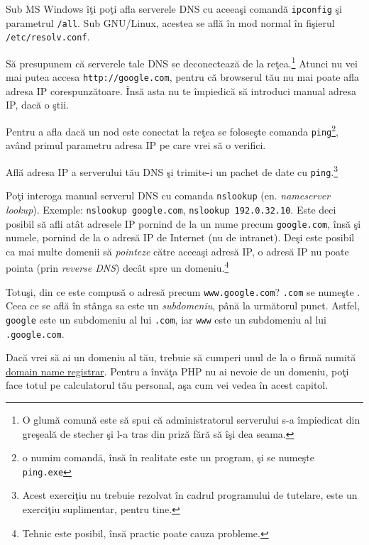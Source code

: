 Sub MS Windows îţi poţi afla serverele DNS cu aceeaşi comandă \texttt{ipconfig} şi parametrul
\texttt{/all}. Sub GNU/Linux, acestea se află în mod normal în fişierul \texttt{/etc/resolv.conf}.

Să presupunem că serverele tale DNS se deconectează de la reţea.\footnote{O glumă
comună este să spui că administratorul serverului s-a împiedicat din greşeală de stecher
şi l-a tras din priză fără să îşi dea seama.} Atunci nu vei mai putea accesa \texttt{http://google.com},
pentru că browserul tău nu mai poate afla adresa IP corespunzătoare. Însă asta nu te împiedică
să introduci manual adresa IP, dacă o ştii.

Pentru a afla dacă un nod este conectat la reţea se foloseşte comanda
\texttt{ping}\footnote{o numim comandă, însă în realitate este un program,
şi se numeşte \texttt{ping.exe}}, având primul
parametru adresa IP pe care vrei să o verifici.

\begin{Exercise}[title={Ping your DNS server}]
Află adresa IP a serverului tău DNS şi trimite-i un pachet de date cu \texttt{ping}.\footnote{Acest exerciţiu nu trebuie
rezolvat în cadrul programului de tutelare, este un exerciţiu suplimentar,
pentru tine.}
\end{Exercise}

Poţi interoga manual serverul DNS cu comanda \texttt{nslookup}
(en. \textsl{nameserver lookup}). Exemple:
\texttt{nslookup google.com}, \texttt{nslookup 192.0.32.10}.
Este deci posibil să afli atât adresele IP pornind de la un nume precum
\texttt{google.com}, însă şi numele, pornind de la o adresă IP de Internet
(nu de intranet).
Deşi este posibil ca mai multe domenii să \textsl{pointeze} către aceeaşi
adresă IP, o adresă IP nu poate {\glqq}pointa{\grqq} (prin \textsl{reverse DNS})
decât spre un domeniu.\footnote{Tehnic este posibil, însă practic poate
cauza probleme.}

Totuşi, din ce este compusă o adresă precum \texttt{www.google.com}?
\texttt{.com} se numeşte . Ceea ce se află în stânga
sa este un \textsl{subdomeniu}, până la următorul punct.
Astfel, \texttt{google} este un subdomeniu al lui \texttt{.com},
iar \texttt{www} este un subdomeniu al lui \texttt{.google.com}.

Dacă vrei să ai un domeniu al tău, trebuie să cumperi unul de la
o firmă numită \href{http://en.wikipedia.org/wiki/Domain_name_registrar}{domain name
registrar}. Pentru a învăţa PHP nu ai nevoie de un domeniu, poţi
face totul pe calculatorul tău personal, aşa cum vei vedea în acest capitol.

